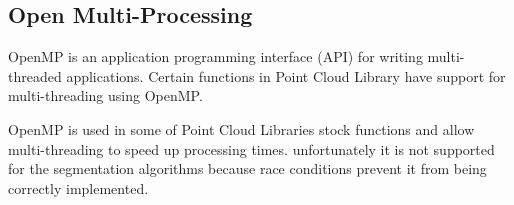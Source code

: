 	\subsection{Open Multi-Processing}
		OpenMP is an application programming interface (API) for writing multi-threaded applications. Certain functions in Point Cloud Library have support for multi-threading using OpenMP.
		
		OpenMP is used in some of Point Cloud Libraries stock functions and allow multi-threading to speed up processing times. unfortunately it is not supported for the segmentation algorithms because race conditions prevent it from being correctly implemented. 

		
		
		
		
		
		
		
		
		
		